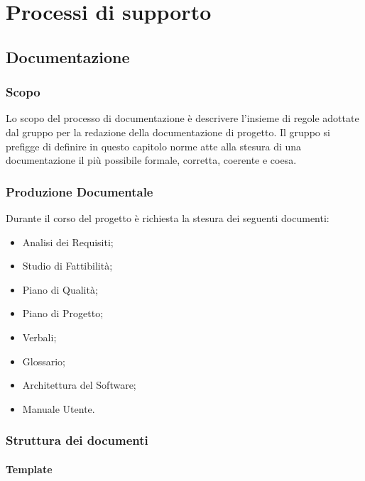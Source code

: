 \documentclass[../NormediProgetto.tex]{subfiles}
\begin{document}

\chapter{Processi di supporto}


\section{Documentazione}

\subsection{Scopo} 

Lo scopo del processo di documentazione è descrivere l'insieme di regole adottate dal gruppo per la redazione della documentazione di progetto. Il gruppo si prefigge di definire in questo capitolo norme atte alla stesura di una documentazione il più possibile formale, corretta, coerente e coesa.

\subsection{Produzione Documentale}
Durante il corso del progetto è richiesta la stesura dei seguenti documenti:
\begin{itemize}
	\item Analisi dei Requisiti;
	\item Studio di Fattibilità;
	\item Piano di Qualità;
	\item Piano di Progetto;
	\item Verbali;
	\item Glossario;
	\item Architettura del Software;
	\item Manuale Utente.
\end{itemize}
\subsection{Struttura dei documenti}

\subsubsection{Template}
\end{document}
